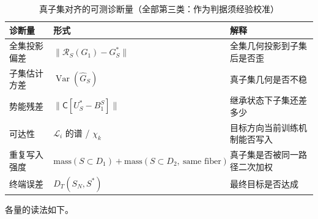 \documentclass[11pt,a4paper]{article}
\DeclareMathOperator{\Var}{Var}
\newcommand{\cL}{\mathcal{L}}   %
\newcommand{\Rstr}{\mathcal{R}}     %
\newcommand{\Center}{\mathsf{C}}    %
\begin{document}
\begin{table}[ht]
\centering
\caption{真子集对齐的可测诊断量（全部第三类：作为判据须经验校准）}\label{tab:s12:diag}
\begin{tabular}{@{}lll@{}}
\toprule
诊断量 & 形式 & 解释 \\
\midrule
全集投影偏差 & $\|\Rstr_S(G_1)-G_S^*\|$ & 全集几何投影到子集后是否歪 \\
子集估计方差 & $\Var(\widehat{G}_S)$ & 真子集几何是否不稳 \\
势能残差 & $\|\Center[U_S^*-B_1^S]\|$ & 继承状态下子集还差多少 \\
可达性 & $\cL_i$ 的谱 / $\chi_k$ & 目标方向当前训练机制能否写入 \\
重复写入强度 & $\mathrm{mass}(S\subset D_1)+\mathrm{mass}(S\subset D_2,\ \text{same fiber})$ & 真子集是否被同一路径二次加权 \\
终端误差 & $D_T(S_N,S^*)$ & 最终目标是否达成 \\
\bottomrule
\end{tabular}
\end{table}

各量的读法如下。
\end{document}
